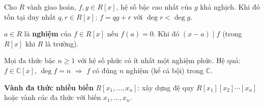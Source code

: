 \documentclass[12pt,a4paper]{article}
\begin{document}
\begin{dinhly}[title={Thuật toán chia}]
  Cho $R$ vành giao hoán, $f, g \in R[x]$, hệ số bậc cao nhất của $g$ khả nghịch. Khi đó tồn tại duy nhất $q, r \in R[x]$: $f = qg + r$ với $\deg r < \deg g$.
\end{dinhly}

\begin{dinhnghia}
  $a \in R$ là \textbf{nghiệm} của $f \in R[x]$ nếu $f(a) = 0$. Khi đó $(x - a) \mid f$ (trong $R[x]$ khi $R$ là trường).
\end{dinhnghia}

\begin{dinhly}[title={Định lý cơ bản của đại số}]
  Mọi đa thức bậc $n \ge 1$ với hệ số phức có ít nhất một nghiệm phức. Hệ quả: $f \in \mathbb{C}[x]$, $\deg f = n$ $\Rightarrow$ $f$ có đúng $n$ nghiệm (kể cả bội) trong $\mathbb{C}$.
\end{dinhly}

\begin{dinhnghia}
  \textbf{Vành đa thức nhiều biến} $R[x_1, \ldots, x_n]$: xây dựng đệ quy $R[x_1][x_2]\cdots[x_n]$ hoặc vành các đa thức với biến $x_1, \ldots, x_n$.
\end{dinhnghia}
\end{document}
